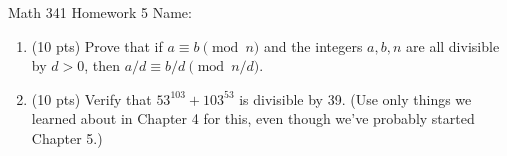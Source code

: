 \documentclass[12pt]{article}
\begin{document}
	Math 341 Homework 5
	\hfill
	Name: \underline{\hspace*{2in}}
	
\begin{enumerate}
	\item  (10 pts) Prove that if $a\equiv b\pmod n$ and the integers $a,b,n$ are all divisible by $d>0$, then $a/d\equiv b/d\pmod{n/d}$.
	\vfill
	\item (10 pts) Verify that $53^{103}+103^{53}$ is divisible by 39. (Use only things we learned about in Chapter 4 for this, even though we've probably started Chapter 5.)
	\vfill 
	
\end{enumerate}
		
\end{document}
